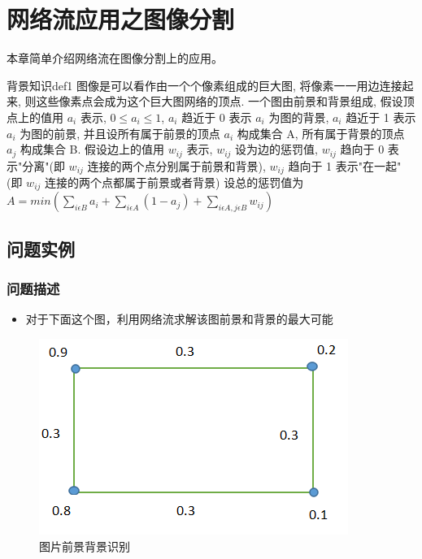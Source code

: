 \chapter{网络流应用之图像分割}


\centering 本章简单介绍网络流在图像分割上的应用。


\begin{definition}{背景知识}{def1}
    图像是可以看作由一个个像素组成的巨大图, 将像素一一用边连接起来, 则这些像素点会成为这个巨大图网络的顶点.
    一个图由前景和背景组成, 假设顶点上的值用 $a_i$ 表示, $ 0 \leq a_i \leq 1 $,  $a_i$ 趋近于 0 表示 $a_i$ 为图的背景, $a_i$ 趋近于 1 表示 $a_i$ 为图的前景, 并且设所有属于前景的顶点 $a_i$ 构成集合 A, 所有属于背景的顶点 $a_j$ 构成集合 B.
    假设边上的值用 $w_{ij}$ 表示, $w_{ij}$ 设为边的惩罚值, $w_{ij}$ 趋向于 0 表示"分离"(即 $w_{ij}$ 连接的两个点分别属于前景和背景), $w_{ij}$ 趋向于 1 表示"在一起"(即 $w_{ij}$ 连接的两个点都属于前景或者背景)
    设总的惩罚值为 $ A = min\left(\sum_{i \epsilon B}a_i +  \sum_{i \epsilon A}(1 - a_j) + \sum_{i \epsilon A, j \epsilon B}w_{ij} \right) $
\end{definition}


\section{问题实例}
\subsection{问题描述}
\begin{itemize}
    \item 对于下面这个图，利用网络流求解该图前景和背景的最大可能
\end{itemize}

\begin{figure}[htb]
	\centering
	\includegraphics[scale=0.6]{image/Image-segmentation2.png}
	\caption{图片前景背景识别}\label{fig1}
\end{figure}

